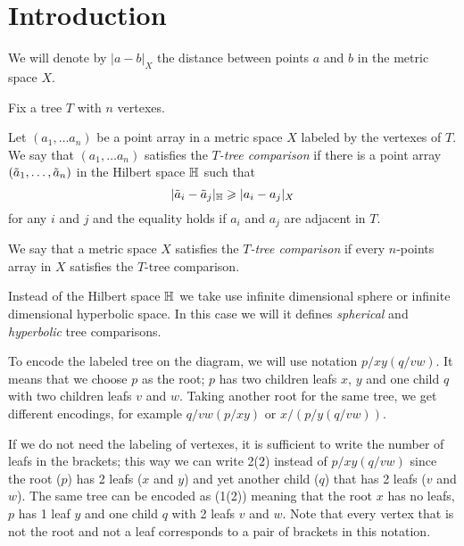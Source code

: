 \section{Introduction}\label{sec:intro}

We will denote by $|a-b|_X$ the distance between points $a$ and $b$ in the metric space $X$.

Fix a tree $T$ with $n$ vertexes.

Let $(a_1,\dots a_n)$ be a point array in a metric space $X$ labeled by the vertexes of $T$.
We say that $(a_1,\dots a_n)$  satisfies the \emph{$T$-tree comparison} if there is a point array $(\~a_1,\dots, \~a_n)$ in the Hilbert space $\HH$ such that 
\[|\~a_i-\~a_j|_\HH\ge|a_i-a_j|_X\]
for any $i$ and $j$ and the equality holds if $a_i$ and $a_j$ are adjacent in $T$.

We say that a metric space $X$ satisfies the \emph{$T$-tree comparison} if 
every $n$-points array in $X$ satisfies the $T$-tree comparison.

Instead of the Hilbert space $\HH$ we take use infinite dimensional sphere or infinite dimensional hyperbolic space.
In this case we will it defines \emph{spherical} and \emph{hyperbolic} tree comparisons.

\begin{wrapfigure}{r}{27 mm}
\vskip-8mm
\end{wrapfigure}

To encode the labeled tree on the diagram, we will use notation $p/xy(q/vw)$.
It means that we choose $p$ as the root; 
$p$ has two children leafs $x$, $y$ and one child $q$ with two children leafs $v$ and $w$.
Taking another root for the same tree, we get different encodings, for example $q/vw(p/xy)$ or $x/(p/y(q/vw))$.

If we do not need the labeling of vertexes,
it is sufficient to write the number of leafs in the brackets;
this way we can write 2(2) instead of $p/xy(q/vw)$ since the root ($p$) has 2 leafs ($x$ and $y$) and yet another child ($q$) that has 2 leafs ($v$ and $w$).  
The same tree can be encoded as (1(2)) meaning that the root $x$ has no leafs, 
$p$ has 1 leaf $y$ and one child $q$ with 2 leafs $v$ and $w$.
Note that every vertex that is not the root and not a leaf corresponds to a pair of brackets in this notation.


